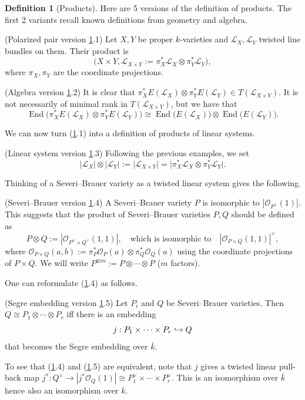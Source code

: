 \documentclass{amsart}
\theoremstyle{definition}
\newtheorem{defn}[thm]{Definition}
\theoremstyle{remark}
\renewcommand{\o}[0]{{\mathcal O}}
\newcommand{\qtq}[1]{\quad\mbox{#1}\quad}
\def\into{\DOTSB\lhook\joinrel\to}
\newcommand{\End}[0]{\operatorname{End}}
\begin{document}
\begin{defn}[Products] \label{prod.defn}
Here are 5 versions of the definition of products.
The first 2 variants recall known definitions from geometry and algebra.

\medskip
(Polarized pair version \ref{prod.defn}.1)  Let $X, Y$ be proper
$k$-varieties and ${\mathcal L}_X, {\mathcal L}_Y$ twisted line bundles on them.
Their product is
$$
\bigl(X\times Y, {\mathcal L}_{X\times Y}:=\pi_X^*{\mathcal L}_X\otimes \pi_Y^*{\mathcal L}_Y\bigr),
$$
where $\pi_X, \pi_Y$ are the coordinate projections.

\medskip
(Algebra version \ref{prod.defn}.2)  It is clear that
$\pi_X^*E({\mathcal L}_X)\otimes \pi_Y^*E({\mathcal L}_Y)\in T({\mathcal L}_{X\times Y})$. It is not necessarily
of minimal rank in $T({\mathcal L}_{X\times Y})$, but we have that
$$
\End\bigl(\pi_X^*E({\mathcal L}_X)\otimes \pi_Y^*E({\mathcal L}_Y)\bigr)
\cong \End\bigl(E({\mathcal L}_X)\bigr)\otimes\End\bigl(E({\mathcal L}_Y)\bigr).
$$


We can now turn (\ref{prod.defn}.1) into a definition of products of linear systems.

\medskip
(Linear system  version \ref{prod.defn}.3) Following the previous examples, we  set
$$
|{\mathcal L}_X|\otimes |{\mathcal L}_Y|:=|{\mathcal L}_{X\times Y}|=\bigl| \pi_X^*{\mathcal L}_X\otimes \pi_Y^*{\mathcal L}_Y\bigr|.
$$  

Thinking of a Severi--Brauer variety as a twisted linear system
gives the following.

\medskip
(Severi--Brauer version \ref{prod.defn}.4) A Severi--Brauer variety $P$
is isomorphic to  $|\o_{P^{\vee}}(1)|$. This suggests that the product  
of  Severi--Brauer varieties $P,Q$  should be  defined as
$$
 P\otimes Q:=|\o_{P^{\vee}\times Q^{\vee}}(1,1)|, \qtq{which is isomorphic to}
|\o_{P\times Q}(1,1)|^{\vee},
$$
where $ \o_{P\times Q}(a,b):=\pi_P^*\o_P(a)\otimes\pi_Q^*\o_Q(a) $
using the coordinate projections of $P\times Q$. 
We will write 
$P^{\otimes m}:=P\otimes \cdots \otimes P$  ($m$ factors).
\medskip

One can reformulate (\ref{prod.defn}.4) as follows.

\medskip
(Segre embedding version \ref{prod.defn}.5) Let $P_i$ and $Q$ be 
Severi--Brauer varieties.  Then $Q\cong P_1\otimes\cdots\otimes P_r$ iff there is an embedding
$$
j:P_1\times\cdots\times P_r\into Q
$$
that becomes the Segre embedding over $\bar k$. 
\medskip

To see that (\ref{prod.defn}.4) and (\ref{prod.defn}.5) are equivalent,
note that $j$ gives a twisted linear pull-back map
$j^*: Q^{\vee}\to |j^*\o_Q(1)|\cong P_1^{\vee}\times\cdots\times P_r^{\vee}$.
This is an isomorphism over $\bar k$ hence also an isomorphism over $k$.
\end{defn}
\end{document}
